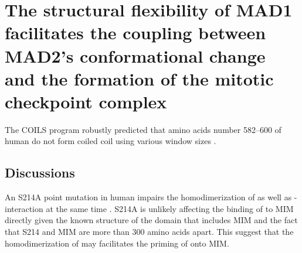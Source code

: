 \chapter{The structural flexibility of MAD1 facilitates the coupling between MAD2's conformational change and the formation of the mitotic checkpoint complex}
\label{chpt:4}
The COILS program robustly predicted that amino acids number 582--600 of human  do not form coiled coil using various window sizes \cite{LupasCOILS}.

\section*{Discussions}

An S214A point mutation in human  impairs the homodimerization of  as well as - interaction at the same time \cite{ATMPhosphorylatesMad1S214}. S214A is unlikely affecting the binding of  to  MIM directly given the known structure of the domain that includes MIM \cite{Structure1GO4} and the fact that S214 and MIM are more than 300 amino acids apart. This suggest that the homodimerization of  may facilitates the priming of  onto  MIM.